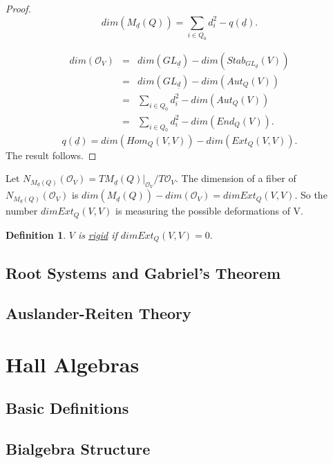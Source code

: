\documentclass{book}
\newtheorem{definition}[theorem]{Definition}
\begin{document}
		\begin{proof}
			$$dim(M_{\underline{d}}(Q)) =  \displaystyle \sum_{i \in Q_0} d_i^2 - q(\underline{d}) .$$

			\begin{eqnarray*}
				dim(\mathcal{O}_V) &=&  dim(GL_{\underline{d}}) - dim(Stab_{GL_{\underline{d}}}(V)) \\
							&=&   dim(GL_{\underline{d}}) - dim(Aut_{Q}(V)) \\
							&=&  \displaystyle \sum_{i \in Q_0} d_i^2  - dim(Aut_{Q}(V)) \\
							&=&  \displaystyle \sum_{i \in Q_0} d_i^2  - dim(End_{Q}(V)). 
			\end{eqnarray*}
			$$q(\underline{d}) = dim(Hom_Q(V,V)) - dim(Ext_Q(V,V)).$$
			The result follows.
		\end{proof}

		Let $N_{M_{\underline{d}}(Q)}(\mathcal{O}_V) = TM_{\underline{d}}(Q)|_{\mathcal{O}_V} /T\mathcal{O}_V$. The dimension of a fiber of $N_{M_{\underline{d}}(Q)}(\mathcal{O}_V)$ is  $dim(M_{\underline{d}}(Q)) - dim (\mathcal{O}_V) = dim Ext_Q(V,V)$. So the number $dim Ext_Q(V,V)$ is measuring the possible deformations of V. 

		\begin{definition}
			$V$ is \underline{rigid} if  $dim Ext_Q(V,V)=0.$
		\end{definition} 


  \section{Root Systems and Gabriel's Theorem}

  \section{Auslander-Reiten Theory}


\chapter{Hall Algebras}

  \section{Basic Definitions}

  \section{Bialgebra Structure}
\end{document}
